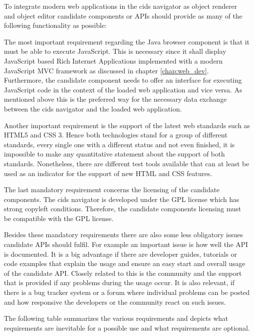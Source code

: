 To integrate modern web applications in the cids navigator as object renderer and object editor candidate components or APIs should provide as many of the following functionality as possible:

The most important requirement regarding the Java browser component is that it must be able to execute JavaScript.
This is necessary since it shall display JavaScript based Rich Internet Applications implemented with a modern JavaScript MVC framework as discussed in chapter \ref{chap:web_dev}.
Furthermore, the candidate component needs to offer an interface for executing JavaScript code in the context of the loaded web application and vice versa.
As mentioned above this is the preferred way for the necessary data exchange between the cids navigator and the  loaded web application.

Another important requirement is the support of the latest web standards such as HTML5 and CSS 3.
Hence both technologies stand for a group of different standards, every single one with a different status and not even finished, it is impossible to make any quantitative statement about the support of both standards.
Nonetheless, there are different test tools available that can at least be used as an indicator for the support of new HTML and CSS features.

The last mandatory requirement concerns the licensing of the candidate components.
The cids navigator is developed under the GPL license which has strong copyleft conditions.
Therefore, the candidate components licensing must be compatible with the GPL license.

Besides these mandatory requirements there are also some less obligatory issues candidate APIs should fulfil.
For example an important issue is how well the API is documented.
It is a big advantage if there are developer guides, tutorials or code examples that explain the usage and ensure an easy start and overall usage of the candidate API.
Closely related to this is the community and the support that is provided if any problems during the usage occur.
It is also relevant, if there is a bug tracker system or a forum where individual problems can be posted and how responsive the developers or the community react on such issues.

The following table summarizes the various requirements and depicts what requirements are inevitable for a possible use and what requirements are optional.


